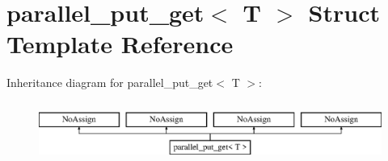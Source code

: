 \hypertarget{structparallel__put__get}{}\section{parallel\+\_\+put\+\_\+get$<$ T $>$ Struct Template Reference}
\label{structparallel__put__get}
Inheritance diagram for parallel\+\_\+put\+\_\+get$<$ T $>$\+:\begin{figure}[H]
\begin{center}
\leavevmode
\includegraphics[height=1.985816cm]{structparallel__put__get}
\end{center}
\end{figure}
